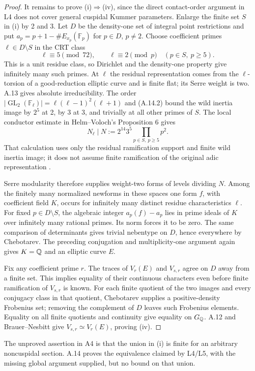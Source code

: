\begin{proof}
It remains to prove (i)$\Rightarrow$(iv), since the direct contact-order
argument in L4 does not cover general cuspidal Kummer parameters.
Enlarge the finite set $S$ in (i) by 2 and 3.  Let $D$ be the density-one
set of integral point restrictions and put
$a_p=p+1-\#E_{x_p}(\mathbb F_p)$ for $p\in D$, $p\ne2$.
Choose coefficient primes $\ell\in D\setminus S$ in the CRT class
\[
 \ell\equiv5\pmod {72},\qquad
 \ell\equiv2\pmod p\quad(p\in S,\ p\ge5).
\tag{A.14.2}
\]
This is a unit residue class, so Dirichlet and the density-one property
give infinitely many such primes.  At $\ell$ the residual representation
comes from the $\ell$-torsion of a good-reduction elliptic curve and is
finite flat; its Serre weight is two.  A.13 gives absolute
irreducibility.  The order
$|\operatorname{GL}_2(\mathbb F_\ell)|=\ell(\ell-1)^2(\ell+1)$
and (A.14.2) bound the wild inertia image by $2^5$ at 2, by 3 at 3,
and trivially at all other primes of $S$.  The local conductor estimate
in Helm--Voloch's Proposition 6 gives
\[
 N_\ell\mid N:=2^{14}3^5\prod_{p\in S,\ p\ge5}p^2.
\tag{A.14.3}
\]
That calculation uses only the residual ramification support and finite
wild inertia image; it does not assume finite ramification of the
original adic representation \cite[Theorem 5 and Proposition 6]{LegHelmVoloch2011}.

Serre modularity therefore supplies weight-two forms of levels dividing
$N$.  Among the finitely many normalized newforms in these spaces one
form $f$, with coefficient field $K$, occurs for infinitely many
distinct residue characteristics $\ell$.  For fixed $p\in D\setminus S$,
the algebraic integer $a_p(f)-a_p$ lies in prime ideals of $K$ over
infinitely many rational primes.  Its norm forces it to be zero.
The same comparison of determinants gives trivial nebentype on $D$,
hence everywhere by Chebotarev.  The preceding conjugation and
multiplicity-one argument again gives $K=\mathbb Q$ and an elliptic curve $E$.

Fix any coefficient prime $r$.  The traces of $V_r(E)$ and $V_{s,r}$
agree on $D$ away from a finite set.  This implies equality of their
continuous characters even before finite ramification of $V_{s,r}$ is
known.  For each finite quotient of the two images and every conjugacy
class in that quotient, Chebotarev supplies a positive-density
Frobenius set; removing the complement of $D$ leaves such Frobenius
elements.  Equality on all finite quotients and continuity give equality
on $G_\mathbb Q$.  A.12 and Brauer--Nesbitt give
$V_{s,r}\simeq V_r(E)$, proving (iv).
\end{proof}
The unproved assertion in A4 is that the union in (i) is finite for an
arbitrary noncuspidal section.  A.14 proves the equivalence claimed by
L4/L5, with the missing global argument supplied, but no bound on that
union.

